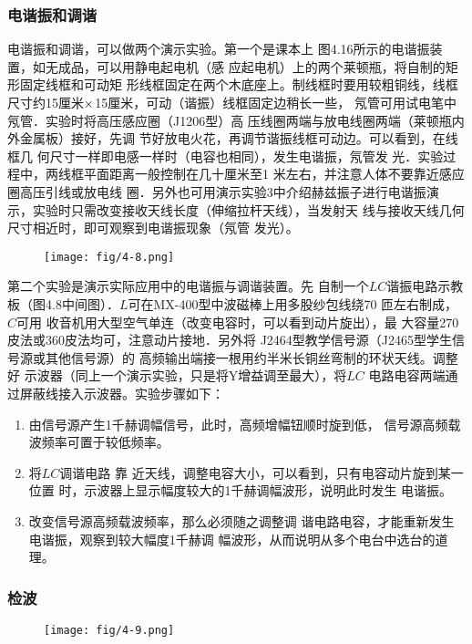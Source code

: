 \subsubsection{电谐振和调谐}
电谐振和调谐，可以做两个演示实验。第一个是课本上
图4.16所示的电谐振装置，如无成品，可以用静电起电机（感
应起电机）上的两个莱顿瓶，将自制的矩形固定线框和可动矩
形线框固定在两个木底座上。制线框时要用较粗铜线，线框
尺寸约15厘米$\times$15厘米，可动（谐振）线框固定边稍长一些，
氖管可用试电笔中氖管．实验时将高压感应圈（J1206型）高
压线圈两端与放电线圈两端（莱顿瓶内外金属板）接好，先调
节好放电火花，再调节谐振线框可动边。可以看到，在线框几
何尺寸一样即电感一样时（电容也相同），发生电谐振，氖管发
光．实验过程中，两线框平面距离一般控制在几十厘米至1
米左右，并注意人体不要靠近感应圈高压引线或放电线
圈．另外也可用演示实验3中介绍赫兹振子进行电谐振演
示，实验时只需改变接收天线长度（伸缩拉杆天线），当发射天
线与接收天线几何尺寸相近时，即可观察到电谐振现象（氖管
发光）。

\begin{figure}[htp]
    \centering
\texttt{[image: fig/4-8.png]}
    \caption{}
\end{figure}

第二个实验是演示实际应用中的电谐振与调谐装置。先
自制一个$LC$谐振电路示教板（图4.8中间图）．$L$可在MX-400型中波磁棒上用多股纱包线绕70 匝左右制成，$C$可用
收音机用大型空气单连（改变电容时，可以看到动片旋出），最
大容量270皮法或360皮法均可，注意动片接地．另外将
J2464型教学信号源（J2465型学生信号源或其他信号源）的
高频输出端接一根用约半米长铜丝弯制的环状天线。调整好
示波器（同上一个演示实验，只是将Y增益调至最大），将$LC$
电路电容两端通过屏蔽线接入示波器。实验步骤如下：
\begin{enumerate}
\item 由信号源产生1千赫调幅信号，此时，高频增幅钮顺时旋到低，
信号源高频载波频率可置于较低频率。
\item 将$LC$调谐电路 靠
近天线，调整电容大小，可以看到，只有电容动片旋到某一位置
时，示波器上显示幅度较大的1千赫调幅波形，说明此时发生
电谐振。
\item 改变信号源高频载波频率，那么必须随之调整调
谐电路电容，才能重新发生电谐振，观察到较大幅度1千赫调
幅波形，从而说明从多个电台中选台的道理。
\end{enumerate}

\subsubsection{检波}


\begin{figure}[htp]
    \centering
\texttt{[image: fig/4-9.png]}
    \caption{}
\end{figure}

